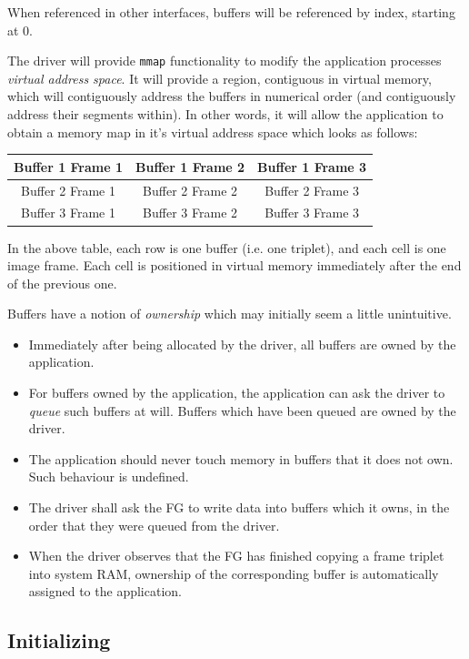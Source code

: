 \documentclass[12pt]{article}
\begin{document}
When referenced in other interfaces, buffers will be referenced by index, starting at 0.

The driver will provide \texttt{mmap} functionality to modify the application processes \textit{virtual address space}. It will provide a region, contiguous in virtual memory, which will contiguously address the buffers in numerical order (and contiguously address their segments within). In other words, it will allow the application to obtain a memory map in it's virtual address space which looks as follows:

\begin{tabular}{|c|c|c|}\hline
Buffer 1 Frame 1 & Buffer 1 Frame 2 & Buffer 1 Frame 3 \\ \hline
Buffer 2 Frame 1 & Buffer 2 Frame 2 & Buffer 2 Frame 3 \\ \hline
Buffer 3 Frame 1 & Buffer 3 Frame 2 & Buffer 3 Frame 3 \\ \hline
\end{tabular}

In the above table, each row is one buffer (i.e. one triplet), and each cell is one image frame. Each cell is positioned in virtual memory immediately after the end of the previous one.

Buffers have a notion of \textit{ownership} which may initially seem a little unintuitive.
\begin{itemize}
\item Immediately after being allocated by the driver, all buffers are owned by the application.
\item For buffers owned by the application, the application can ask the driver to \textit{queue} such buffers at will. Buffers which have been queued are owned by the driver.
\item The application should never touch memory in buffers that it does not own. Such behaviour is undefined.
\item The driver shall ask the FG to write data into buffers which it owns, in the order that they were queued from the driver.
\item When the driver observes that the FG has finished copying a frame triplet into system RAM, ownership of the corresponding buffer is automatically assigned to the application.
\end{itemize}

\subsection{Initializing}
\end{document}
